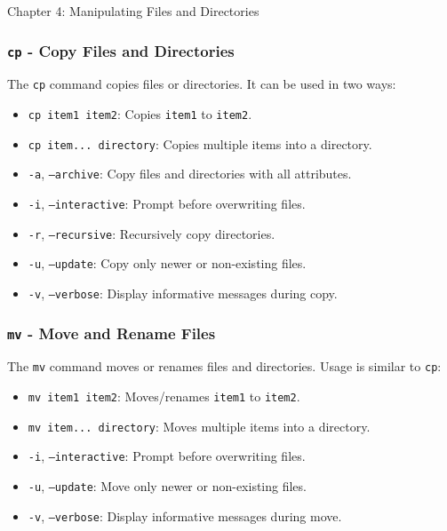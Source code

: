 \begin{notes}{Chapter 4: Manipulating Files and Directories}
    \subsubsection*{\texttt{cp} - Copy Files and Directories}

    The \texttt{cp} command copies files or directories. It can be used in two ways:
    \begin{itemize}
        \item \texttt{cp item1 item2}: Copies \texttt{item1} to \texttt{item2}.
        \item \texttt{cp item... directory}: Copies multiple items into a directory.
    \end{itemize}

    \begin{highlight}
    \begin{itemize}
        \item \texttt{-a}, \texttt{--archive}: Copy files and directories with all attributes.
        \item \texttt{-i}, \texttt{--interactive}: Prompt before overwriting files.
        \item \texttt{-r}, \texttt{--recursive}: Recursively copy directories.
        \item \texttt{-u}, \texttt{--update}: Copy only newer or non-existing files.
        \item \texttt{-v}, \texttt{--verbose}: Display informative messages during copy.
    \end{itemize}
    \end{highlight}

    \subsubsection*{\texttt{mv} - Move and Rename Files}

    The \texttt{mv} command moves or renames files and directories. Usage is similar to \texttt{cp}:
    \begin{itemize}
        \item \texttt{mv item1 item2}: Moves/renames \texttt{item1} to \texttt{item2}.
        \item \texttt{mv item... directory}: Moves multiple items into a directory.
    \end{itemize}

    \begin{highlight}
    \begin{itemize}
        \item \texttt{-i}, \texttt{--interactive}: Prompt before overwriting files.
        \item \texttt{-u}, \texttt{--update}: Move only newer or non-existing files.
        \item \texttt{-v}, \texttt{--verbose}: Display informative messages during move.
    \end{itemize}
    \end{highlight}


\end{notes}
